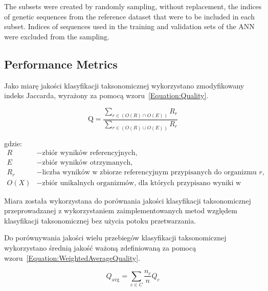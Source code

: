 \documentclass{article}
\newcommand{\temporary}[1]{
    \begin{tcolorbox}[colframe=red, colback=white, title={\textbf{WERSJA PO POLSKU}}, sharp corners=south]
        #1
    \end{tcolorbox}
}
\begin{document}
                The subsets were created by randomly sampling, without replacement, the indices of genetic sequences from the reference dataset that were to be included in each subset. Indices of sequences used in the training and validation sets of the ANN were excluded from the sampling. 

        \subsection{Performance Metrics}

            \temporary{
                Jako miarę jakości klasyfikacji taksonomicznej wykorzystano zmodyfikowany indeks Jaccarda, wyrażony za pomocą wzoru~\ref{Equation:Quality}.

                \begin{equation}
                    \text{Q} = \frac{
                        \sum_{r \in (O(R) \cap O(E))} R_{r}
                    }{
                        \sum_{r \in (O(R) \cup O(E))} R_{r}
                    }
                    \label{Equation:Quality}
                \end{equation}
        
                gdzie:
                \begin{align*}
                    R &- \text{zbiór wyników referencyjnych,} \\
                    E &- \text{zbiór wyników otrzymanych,} \\
                    R_{r} &- \text{liczba wyników w zbiorze referencyjnym przypisanych do organizmu $r$,} \\
                    O(X) &- \text{zbiór unikalnych organizmów, dla których przypisano wyniki w zbiorze X. }
                \end{align*}
        
                Miara została wykorzystana do porównania jakości klasyfikacji taksonomicznej przeprowadzanej z wykorzystaniem zaimplementowanych metod względem klasyfikacji taksonomicznej bez użycia potoku przetwarzania.
        
                Do porównywania jakości wielu przebiegów klasyfikacji taksonomicznej wykorzystano średnią jakość ważoną zdefiniowaną za pomocą wzoru~\ref{Equation:WeightedAverageQuality}.
        
                \begin{equation}
                    Q_{\text{avg}} = \sum_{c \in C} \frac{n_c}{n} Q_c
                    \label{Equation:WeightedAverageQuality}
                \end{equation}
        
}
\end{document}
